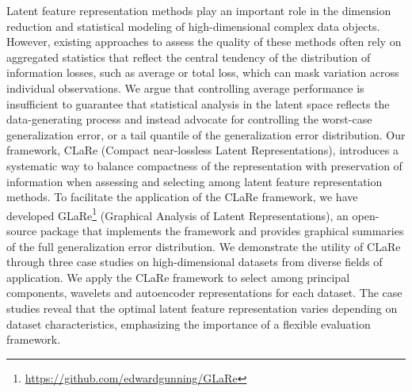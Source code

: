 Latent feature representation methods play an important role in the dimension reduction and statistical modeling of high-dimensional complex data objects.
However, existing approaches to assess the quality of these methods often rely on aggregated statistics that reflect the central tendency of the distribution of information losses, such as average or total loss, which can mask variation across individual observations.
We argue that controlling average performance is insufficient to guarantee that statistical analysis in the latent space reflects the data-generating process and instead advocate for controlling the worst-case generalization error, or a tail quantile of the generalization error distribution.
Our framework, CLaRe (Compact near-lossless Latent Representations), introduces a systematic way to balance compactness of the representation with preservation of information when assessing and selecting among latent feature representation methods. 
To facilitate the application of the CLaRe framework, we have developed GLaRe\footnote{\url{https://github.com/edwardgunning/GLaRe}} (Graphical Analysis of Latent Representations), an open-source  package that implements the framework and provides graphical summaries of the full generalization error distribution.
We demonstrate the utility of CLaRe through three case studies on high-dimensional datasets from diverse fields of application.
We apply the CLaRe framework to select among principal components, wavelets and autoencoder representations for each dataset.
The case studies reveal that the optimal latent feature representation varies depending on dataset characteristics, emphasizing the importance of a flexible evaluation framework.